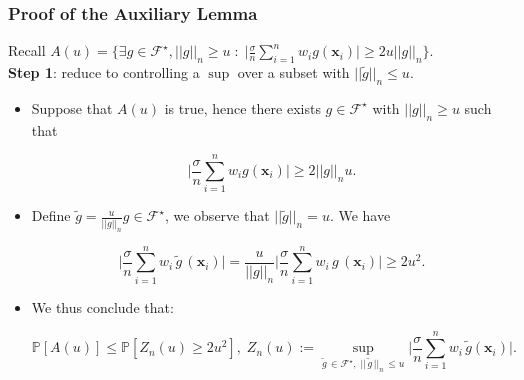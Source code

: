\documentclass[11pt]{beamer}
\newcommand{\Prob}{\mathbb{P}}
\newcommand{\bx}{\mathbf{x}}
\newcommand{\cF}{\mathcal{F}}
\begin{document}
	\begin{frame}
		\frametitle{Proof of the Auxiliary Lemma}
		Recall 
		$A(u) = \Big\{\exists g \in \cF^\star, ||g||_n \geq u \;:\; \Big|\frac{\sigma}{n}\sum_{i = 1}^{n} w_i g(\bx_i)\Big|\geq 2u ||g||_n\Big\}.$\\
		\textbf{Step 1}: reduce  to controlling a $\sup$ over a subset with $||\widetilde g||_n\leq u$.
		\begin{itemize}		
			\item Suppose that $A(u)$ is true, hence  there exists				
			$g \in \cF^\star$ with $||g||_n\geq u$ such that			 
			 \begin{small}
			 \begin{equation*}
			 	\Big|\frac{\sigma}{n}\sum_{i = 1}^{n}w_i g(\bx_i)\Big|\geq 2||g||_n u.
			 \end{equation*}
			 \end{small}
			\item Define $\widetilde{g} = \frac{u}{||g||_n}g \in \cF^\star$, we observe that $||\widetilde{g}||_n = u$. We have 
			\begin{small}
			\begin{equation*}
				\Big|\frac{\sigma}{n}\sum_{i = 1}^{n}w_i\,\widetilde{g}\,(\bx_i)\Big| = \frac{u}{||g||_n}\Big|\frac{\sigma}{n}\sum_{i = 1}^{n}w_i\,g\,(\bx_i)\Big|\geq 2u^2.
			\end{equation*}
			\end{small}
			\item We thus conclude that:
			\begin{small}
				\begin{equation*}
				\Prob[A(u)] \leq \Prob[Z_n(u)\geq 2u^2], \; Z_n(u) := \sup_{\widetilde{g}\,\in \cF^\star, \; ||\,\widetilde{g}\,||_n\, \leq u}\bigg|\frac{\sigma}{n}\sum_{i = 1}^{n}w_i\,\widetilde{g}(\bx_i)\bigg|.
				\end{equation*}
			\end{small}			
		\end{itemize}		
	\end{frame}
\end{document}

